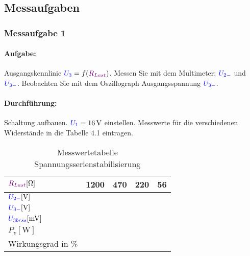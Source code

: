 \documentclass[11pt,a4paper,titlepage,parskip=half]{scrreprt}
\begin{document}
            \subsection{Messaufgaben}
            \subsubsection{Messaufgabe 1}
            \paragraph{Aufgabe:}  Ausgangskennlinie $\textcolor{blue}{U_3} = f(\textcolor{violet}{R_{Last}})$. Messen Sie mit dem Multimeter: $\textcolor{blue}{U_{2-}}$ und $\textcolor{blue}{U_{3-}}$. Beobachten Sie mit dem Oszillograph Ausgangsspannung $\textcolor{blue}{U_{3-}}$.
            
            \paragraph{Durchführung:} Schaltung aufbauen. $\textcolor{blue}{U_1} = \SI{16}{\volt}$ einstellen. Messwerte für die verschiedenen Widerstände in die Tabelle 4.1 eintragen.
            
            \begin{table}[H]
                \caption{Messwertetabelle Spannungsserienstabilisierung}
                \label{tbl:messergebnisse4.1}
                \renewcommand{\arraystretch}{1.6}
                \begin{center}
                    \begin{tabular}{l|c|c|c|c}
                        $\textcolor{violet}{R_{Last}} [\si{\ohm}]$ & 1200 & 470 & 220 & 56 \\ \hline
                        $\textcolor{blue}{U_{2-}} [\si{\volt}]$  & \qquad\qquad\qquad  & \qquad\qquad\qquad & \qquad\qquad\qquad &\qquad\qquad\qquad\\\hline
                        $\textcolor{blue}{U_{3-}} [\si{\volt}]$ &  &  &  & \\\hline
                        $\textcolor{blue}{U_{3brss}} [\si{\milli\volt}]$ &  &  &  &  \\\hline
                        $P_v [\si{\watt}]$ &   &   &   &  \\\hline
                        Wirkungsgrad in \% &  &  &   &  \\
                    \end{tabular}
                \end{center}
            \end{table}
            
\end{document}
